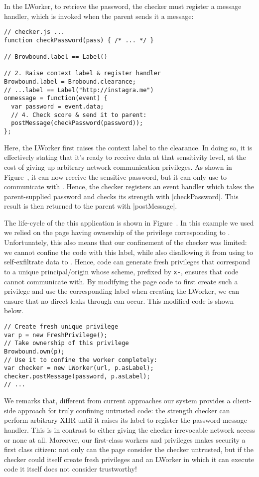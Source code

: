 In the LWorker, to retrieve the password, the checker must register a
message handler, which is invoked when the parent sends it a message:
\begin{lstlisting}
// checker.js ...
function checkPassword(pass) { /* ... */ }

// Browbound.label == Label()

// 2. Raise context label & register handler
Browbound.label = Brobound.clearance;
// ...label == Label("http://instagra.me")
onmessage = function(event) {
  var password = event.data;
  // 4. Check score & send it to parent:
  postMessage(checkPassword(password));
};
\end{lstlisting}
%
Here, the LWorker first raises the context label to the clearance.
%
In doing so, it is effectively stating that it's ready to receive data
at that sensitivity level, at the cost of giving up arbitrary network
communication privileges.
%
As shown in Figure~, it can now receive the
sensitive password, but it can only use \xhr{} to communicate with
.
%
Hence, the checker registers an event handler which takes the
parent-supplied password and checks its strength with
\js|checkPassword|.
%
This result is then returned to the parent with \js|postMessage|.

The life-cycle of the this application is shown in
Figure~.
%
In this example we used we relied on the page having ownership of the
privilege corresponding to .
%
Unfortunately, this also means that our confinement of the checker was
limited: we cannot confine the code with this label, while also
disallowing it from using \xhr{} to self-exfiltrate data to
.
%
Hence, code can generate fresh privileges that correspond to a unique
principal/origin whose scheme, prefixed by \texttt{x-}, ensures that
code cannot communicate with.
%
By modifying the page code to first create such a privilege and use
the corresponding label when creating the LWorker, we can ensure that
no direct leaks through \xhr{} can occur.
%
This modified code is shown below.
\begin{lstlisting}
// Create fresh unique privilege
var p = new FreshPrivilege();
// Take ownership of this privilege
Browbound.own(p);
// Use it to confine the worker completely:
var checker = new LWorker(url, p.asLabel);
checker.postMessage(password, p.asLabel);
// ...
\end{lstlisting}
%

%
We remarks that, different from current approaches our system provides
a client-side approach for truly confining untrusted code: the strength
checker can perform arbitrary XHR until it raises its label to
register the password-message handler.
%
This is in contrast to either giving the checker irrevocable network
access or none at all.
%
Moreover, our first-class workers and privileges makes security a
first class citizen: not only can the page consider the checker
untrusted, but if the checker could itself create fresh privileges and
an LWorker in which it can execute code it itself does not consider
trustworthy!



